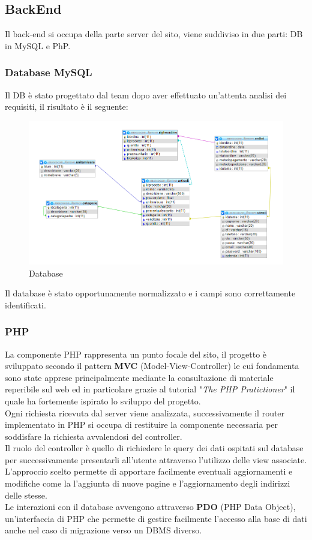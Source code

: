 \subsection{BackEnd}
Il back-end si occupa della parte server del sito, viene suddiviso in due parti: DB in MySQL e PhP.

\subsubsection{Database MySQL}
Il DB è stato progettato dal team dopo aver effettuato un'attenta analisi dei requisiti, il risultato è il seguente:
\begin{figure}[H]
	\includegraphics[width=\linewidth]{res/img/DB}
	\caption{Database}
	\label{Database Walk And Buy}
\end{figure}
Il database è stato opportunamente normalizzato e i campi sono correttamente identificati.

\subsubsection{PHP}
La componente PHP rappresenta un punto focale del sito, il progetto è sviluppato secondo il pattern \textbf{MVC} (Model-View-Controller) le cui fondamenta sono state apprese principalmente mediante la consultazione di materiale reperibile sul web ed in particolare grazie al tutorial "\textit{The PHP Pratictioner}" il quale ha fortemente ispirato lo sviluppo del progetto.\\
Ogni richiesta ricevuta dal server viene analizzata, successivamente il router implementato in PHP si occupa di restituire la componente necessaria per soddisfare la richiesta avvalendosi del controller.\\
Il ruolo del controller è quello di richiedere le query dei dati ospitati sul database per successivamente presentarli all’utente attraverso l’utilizzo delle view associate.\\
L’approccio scelto permette di apportare facilmente eventuali aggiornamenti e modifiche come la l’aggiunta di nuove pagine e l’aggiornamento degli indirizzi delle stesse. \\
Le interazioni con il database avvengono attraverso \textbf{PDO} (PHP Data Object), un’interfaccia di PHP che permette di gestire facilmente l’accesso alla base di dati anche nel caso di migrazione verso un DBMS diverso.\\


